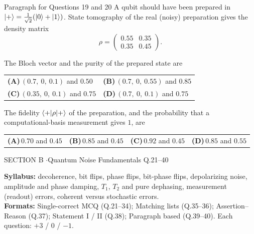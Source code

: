 \documentclass[11pt,a4paper]{article}
\newcommand{\optlabel}[1]{\textbf{(#1)}}
\newenvironment{qitem}[1]{\begin{list}{}{\setlength{\leftmargin}{3.3em}\setlength{\labelwidth}{3.1em}%
  \setlength{\labelsep}{0.2em}\setlength{\topsep}{3pt}\setlength{\parsep}{3pt}}\item[\textbf{Q.#1}\hfill]}{\end{list}}
\newcommand{\qsep}{\par\vspace{2pt}{\color{black!15}\hrule}\vspace{4pt}}
\begin{document}
\begin{passagebox}{Paragraph for Questions 19 and 20}
A qubit should have been prepared in $\ket+ = \frac{1}{\sqrt2}(\ket0 + \ket1)$. State tomography of the real (noisy)
preparation gives the density matrix
\[ \rho = \begin{pmatrix}0.55 & 0.35\\ 0.35 & 0.45\end{pmatrix}. \]
\end{passagebox}
\begin{qitem}{19}
The Bloch vector and the purity of the prepared state are
\par\smallskip\noindent\begin{tabularx}{\linewidth}{@{}*{2}{L}@{}}
\optlabel{A}\,$(0.7,\ 0,\ 0.1)$ and $0.50$ & \optlabel{B}\,$(0.7,\ 0,\ 0.55)$ and $0.85$ \\[3pt]
\optlabel{C}\,$(0.35,\ 0,\ 0.1)$ and $0.75$ & \optlabel{D}\,$(0.7,\ 0,\ 0.1)$ and $0.75$
\end{tabularx}
\end{qitem}
\qsep

\begin{qitem}{20}
The fidelity $\braket{+|\rho|+}$ of the preparation, and the probability that a computational-basis measurement gives $1$, are
\par\smallskip\noindent\begin{tabularx}{\linewidth}{@{}*{4}{L}@{}}
\optlabel{A}\,$0.70$ and $0.45$ & \optlabel{B}\,$0.85$ and $0.45$ & \optlabel{C}\,$0.92$ and $0.45$ & \optlabel{D}\,$0.85$ and $0.55$
\end{tabularx}
\end{qitem}
\qsep

\newpage

\begin{sectionbanner}SECTION B \enspace$\cdot$\enspace Quantum Noise Fundamentals \hfill Q.21--40\end{sectionbanner}

{\small \textbf{Syllabus:} decoherence, bit flips, phase flips, bit-phase flips, depolarizing noise, amplitude and phase damping, $T_1$, $T_2$ and pure dephasing, measurement (readout) errors, coherent versus stochastic errors.\\ \textbf{Formats:} Single-correct MCQ (Q.21--34); Matching lists (Q.35--36); Assertion--Reason (Q.37); Statement I / II (Q.38); Paragraph based (Q.39--40). Each question: $+3$ / $0$ / $-1$.}
\par\medskip
\end{document}
